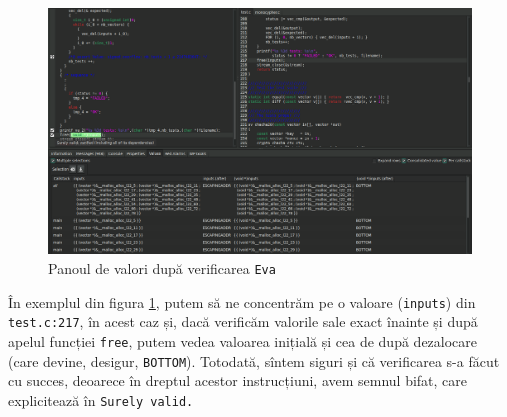 \begin{figure}[!htbp]
  \centering
    \includegraphics[width=1\textwidth]{img/framagui3}
    \caption{Panoul de valori după verificarea \texttt{Eva}}
  \label{fig:vals}
\end{figure}

În exemplul din figura \ref{fig:vals}, putem să ne concentrăm pe o valoare (\texttt{inputs}) din
\texttt{test.c:217}, în acest caz și, dacă verificăm valorile sale exact înainte și după
apelul funcției \texttt{free}, putem vedea valoarea inițială și cea de după dezalocare
(care devine, desigur, \texttt{BOTTOM}). Totodată, sîntem siguri și că verificarea s-a făcut cu
succes, deoarece în dreptul acestor instrucțiuni, avem semnul bifat, care explicitează în
\texttt{Surely valid.}


